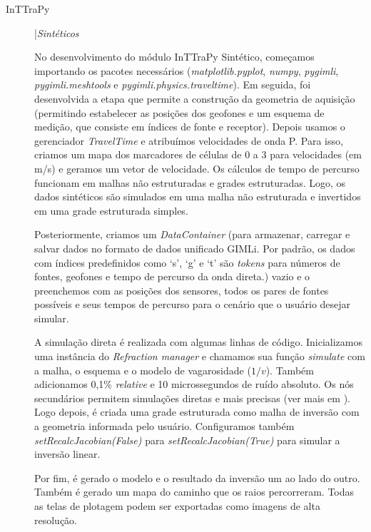 \documentclass[a4paper, 12 pt]{article} %
\begin{document}
\begin{description}
	\item[InTTraPy] |\textit{Sintéticos} 
	
	\hspace{0.5cm} No desenvolvimento do módulo InTTraPy Sintético, começamos importando os pacotes necessários (\textit{matplotlib.pyplot}, \textit{numpy}, \textit{pygimli}, \textit{pygimli.meshtools} e \textit{pygimli.physics.traveltime}). Em seguida, foi desenvolvida a etapa que permite a construção da geometria de aquisição (permitindo estabelecer as posições dos geofones e um esquema de medição, que consiste em índices de fonte e receptor). Depois usamos o gerenciador \textit{TravelTime} e atribuímos velocidades de onda P. Para isso, criamos um mapa dos marcadores de células de 0 a 3 para velocidades (em m/s) e geramos um vetor de velocidade. Os cálculos de tempo de percurso funcionam em malhas não estruturadas e grades estruturadas. Logo, os dados sintéticos são simulados em uma malha não estruturada e invertidos em uma grade estruturada simples.
	
	
	\hspace{0.5cm} Posteriormente, criamos um \textit{DataContainer} (para armazenar, carregar e salvar dados no formato de dados unificado GIMLi. Por padrão, os dados com índices predefinidos como `s', `g' e `t' são \textit{tokens} para números de fontes, geofones e tempo de percurso da onda direta.) vazio e o preenchemos com as posições dos sensores, todos os pares de fontes possíveis e seus tempos de percurso para o cenário que o usuário desejar simular.
	
	\hspace{0.5cm} A simulação direta é realizada com algumas linhas de código. Inicializamos uma instância do \textit{Refraction manager} e chamamos sua função \textit{simulate} com a malha, o esquema e o modelo de vagarosidade ($1/v$). Também adicionamos 0,1\% \textit{relative} e 10 microssegundos de ruído absoluto. Os nós secundários permitem simulações diretas e mais precisas (ver mais em \citealp{giroux2013task}). Logo depois, é criada uma grade estruturada como malha de inversão com a geometria informada pelo usuário. Configuramos também \textit{setRecalcJacobian(False)} para \textit{setRecalcJacobian(True)} para simular a inversão linear.
	
	\hspace{0.5cm} Por fim, é gerado o modelo e o resultado da inversão um ao lado do outro. Também é gerado um mapa do caminho que os raios percorreram. Todas as telas de plotagem podem ser exportadas como imagens de alta resolução.
	
\end{description}
\end{document}
